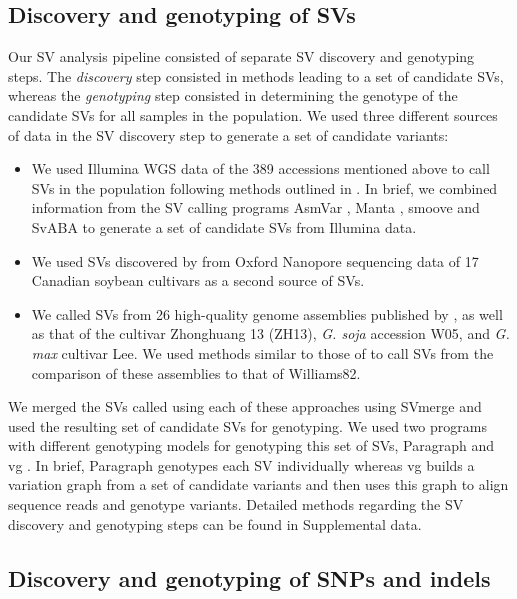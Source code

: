 \subsection*{Discovery and genotyping of SVs}
\label{sv-gwas-sv-discovery-genotyping}

Our SV analysis pipeline consisted of separate SV discovery and genotyping steps.
The \emph{discovery} step consisted in methods leading to a set of candidate SVs,
whereas the \emph{genotyping} step consisted in determining the genotype
of the candidate SVs for all samples in the population. We used three different
sources of data in the SV discovery step to generate a set of candidate variants:

\begin{itemize}
	\item We used Illumina WGS data of the 389 accessions mentioned above
		to call SVs in the population following methods outlined
		in \cite{lemay2022}. In brief, we combined information from
		the SV calling programs AsmVar \citep{liu2015}, Manta \citep{chen2016},
		smoove \citep{pedersen2019} and SvABA \citep{wala2018} to generate
		a set of candidate SVs from Illumina data.
	\item We used SVs discovered by \cite{lemay2022} from Oxford Nanopore
		sequencing data of 17 Canadian soybean cultivars as a second
		source of SVs.
	\item We called SVs from 26 high-quality genome assemblies published by
		\cite{liu2020-pangenome}, as well as that of the cultivar Zhonghuang 13 (ZH13),
		\textit{G. soja} accession W05, and \textit{G. max} cultivar Lee.
		We used methods similar to those of \cite{liu2020-pangenome} to call
		SVs from the comparison of these assemblies to that of Williams82.
\end{itemize}

We merged the SVs called using each of these approaches using SVmerge
\citep{wong2010} and used the resulting set of candidate SVs for genotyping. We
used two programs with different genotyping models for genotyping this set of
SVs, Paragraph \citep{chen2019} and vg \citep{hickey2020}. In brief, Paragraph
genotypes each SV individually whereas vg builds a variation graph from a set
of candidate variants and then uses this graph to align sequence reads and
genotype variants.  Detailed methods regarding the SV discovery and genotyping
steps can be found in Supplemental data.

\subsection*{Discovery and genotyping of SNPs and indels}
\label{sv-gwas-snp-discovery}

